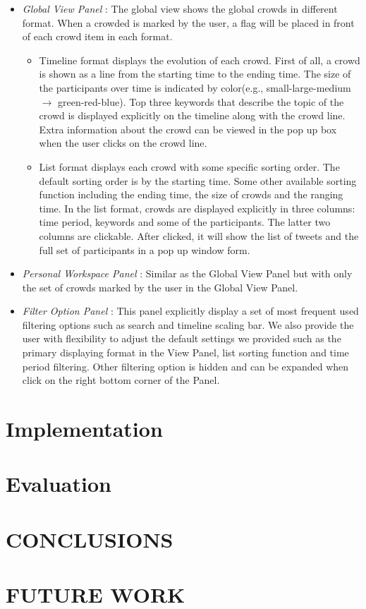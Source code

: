 \documentclass{sig-alternate}
\begin{document}
\begin{itemize}
    \item \textit{Global View Panel} : The global view shows the global crowds
    in different format. When a crowded is marked by the user, a flag will be
    placed in front of each crowd item in each format.

    \begin{itemize}
        \item Timeline format displays the evolution of each crowd.
        First of all, a crowd is shown as a line from the starting time
        to the ending time. The size of the participants over time is
        indicated by color(e.g., small-large-medium $\longrightarrow$
        green-red-blue). Top three keywords that describe the topic of
        the crowd is displayed explicitly on the timeline along with
        the crowd line. Extra information about the crowd can be viewed
        in the pop up box when the user clicks on the crowd line.
        \item List format displays each crowd with some specific
        sorting order. The default sorting order is by the starting
        time. Some other available sorting function including the
        ending time, the size of crowds and the ranging time. In the
        list format, crowds are displayed explicitly in three columns:
        time period, keywords and some of the participants. The latter
        two columns are clickable. After clicked, it will show the list
        of tweets and the full set of participants in a pop up window
        form.
    \end{itemize}

    \item \textit{Personal Workspace Panel} : Similar as the Global View Panel
    but with only the set of crowds marked by the user in the Global View
    Panel.
    \item \textit{Filter Option Panel} : This panel explicitly display a set of
    most frequent used filtering options such as search and timeline scaling
    bar. We also provide the user with flexibility to adjust the default
    settings we provided such as the primary displaying format in the View
    Panel, list sorting function and time period filtering. Other filtering
    option is hidden and can be expanded when click on the right bottom corner
    of the Panel.
\end{itemize}

\section{Implementation}

\section{Evaluation}

\section{CONCLUSIONS}

\section{FUTURE WORK}


 
\end{document}
